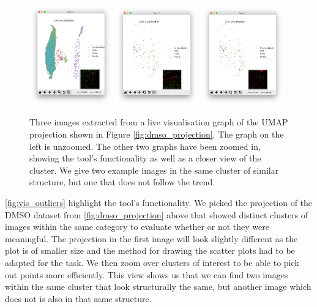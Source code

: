 \begin{figure}[h]
    \centering
    \includegraphics[width=0.32\textwidth]{dissertation/figures/evaluation/right_cluster_big.png}
    \includegraphics[width=0.32\textwidth]{dissertation/figures/evaluation/right_cluster_red_1.png}
    \includegraphics[width=0.32\textwidth]{dissertation/figures/evaluation/right_cluster_red_2.png}
    \caption{Three images extracted from a live visualisation graph of the UMAP projection shown in Figure \ref{fig:dmso_projection}. The graph on the left is unzoomed. The other two graphs have been zoomed in, showing the tool's functionality as well as a closer view of the cluster. We give two example images in the same cluster of similar structure, but one that does not follow the trend.}
    \label{fig:vis_outliers}
\end{figure}

\autoref{fig:vis_outliers} highlight the tool's functionality. We picked the projection of the DMSO dataset from \autoref{fig:dmso_projection} above that showed distinct clusters of images within the same category to evaluate whether or not they were meaningful. The projection in the first image will look slightly different as the plot is of smaller size and the method for drawing the scatter plots had to be adapted for the task. We then zoom over clusters of interest to be able to pick out points more efficiently. This view shows us that we can find two images within the same cluster that look structurally the same, but another image which does not is also in that same structure.

